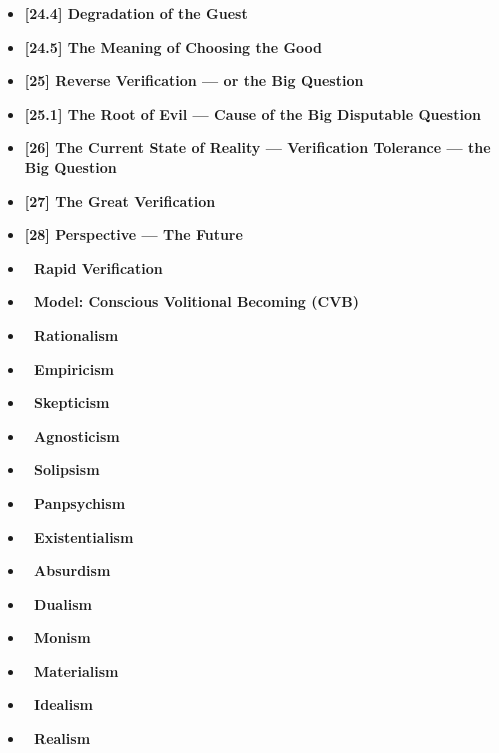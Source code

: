\documentclass[12pt]{article}
\begin{document}
\begin{itemize}
\item \textbf{[24.4] Degradation of the Guest}

\item \textbf{[24.5] The Meaning of Choosing the Good}

\item \textbf{[25] Reverse Verification — or the Big Question}

\item \textbf{[25.1] The Root of Evil — Cause of the Big Disputable Question}

\item \textbf{[26] The Current State of Reality — Verification Tolerance — the Big Question}

\item \textbf{[27] The Great Verification}

\item \textbf{[28] Perspective — The Future}

\item \textbf{📘 Rapid Verification}

\item \textbf{🔷 Model: Conscious Volitional Becoming (CVB)}

\item \textbf{🔷 Rationalism}

\item \textbf{🔷 Empiricism}

\item \textbf{🔷 Skepticism}

\item \textbf{🔷 Agnosticism}

\item \textbf{🔷 Solipsism}

\item \textbf{🔷 Panpsychism}

\item \textbf{🔷 Existentialism}

\item \textbf{🔷 Absurdism}

\item \textbf{🔷 Dualism}

\item \textbf{🔷 Monism}

\item \textbf{🔷 Materialism}

\item \textbf{🔷 Idealism}

\item \textbf{🔷 Realism}


\end{itemize}
\end{document}
